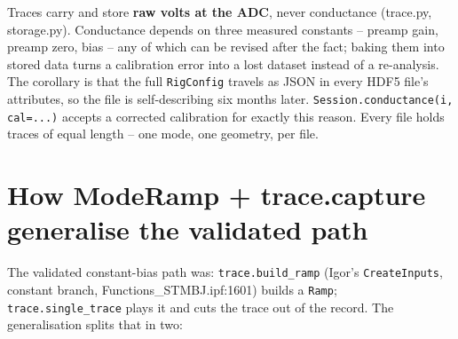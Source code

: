 Traces carry and store \textbf{raw volts at the ADC}, never conductance (trace.py, storage.py). Conductance depends on three measured constants -- preamp gain, preamp zero, bias -- any of which can be revised after the fact; baking them into stored data turns a calibration error into a lost dataset instead of a re-analysis. The corollary is that the full \texttt{Rig\discretionary{}{}{}Config} travels as JSON in every HDF5 file's attributes, so the file is self-describing six months later. \texttt{Session.\discretionary{}{}{}conductance(i,\discretionary{}{}{} cal=.\discretionary{}{}{}.\discretionary{}{}{}.\discretionary{}{}{})} accepts a corrected calibration for exactly this reason. Every file holds traces of equal length -- one mode, one geometry, per file.

\section{How ModeRamp + trace.capture generalise the validated path}

The validated constant-bias path was: \texttt{trace.\discretionary{}{}{}build\_\discretionary{}{}{}ramp} (Igor's \texttt{Create\discretionary{}{}{}Inputs}, constant branch, Functions\_STMBJ.ipf:1601) builds a \texttt{Ramp}; \texttt{trace.\discretionary{}{}{}single\_\discretionary{}{}{}trace} plays it and cuts the trace out of the record. The generalisation splits that in two:

